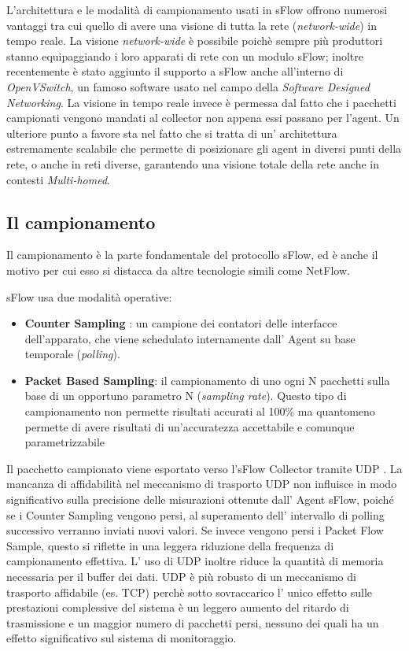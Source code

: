 \documentclass[12pt,a4paper,openright,twoside]{report}
\begin{document}
L'architettura e le modalit\`a di campionamento usati in sFlow offrono numerosi vantaggi
tra cui quello di avere una visione di tutta la rete ({\it network-wide}) in tempo
reale. La visione {\it network-wide} \`e possibile poich\`e sempre pi\`u produttori
stanno equipaggiando i loro apparati di rete con un modulo sFlow; inoltre recentemente
\`e stato aggiunto il supporto a sFlow anche all'interno di {\it OpenVSwitch}, un
famoso software usato nel campo della {\it Software Designed Networking}.
 La visione in tempo reale invece \`e permessa dal fatto che i pacchetti campionati
 vengono mandati al collector non appena essi passano per
l'agent.
Un ulteriore punto a favore sta nel fatto che si tratta di un' architettura
estremamente scalabile che permette di posizionare gli agent in diversi punti della rete,
o anche in reti diverse, garantendo una visione totale della rete anche in contesti
{\it Multi-homed}.

\subsection{Il campionamento}

Il campionamento \`e la parte fondamentale del protocollo sFlow, ed \`e anche
il motivo per cui esso si distacca da altre tecnologie simili come NetFlow.

sFlow usa due modalit\`a operative:
\begin{itemize}
  \item {\bf Counter Sampling} : un campione dei contatori delle interfacce dell'apparato, che viene
  schedulato internamente dall' Agent su base temporale ({\it polling}).
  \item {\bf Packet Based Sampling}: il campionamento di uno ogni N pacchetti
  sulla base di un opportuno parametro N ({\it sampling rate}). Questo tipo di campionamento non
  permette risultati accurati al 100\% ma quantomeno permette di avere risultati
  di un'accuratezza accettabile e comunque parametrizzabile
\end{itemize}

Il pacchetto campionato viene esportato verso l'sFlow Collector tramite UDP \cite{B1}.
La mancanza di affidabilit\`a nel meccanismo di trasporto UDP non influisce in modo
significativo sulla precisione delle misurazioni ottenute dall' Agent sFlow, poich\'e se
i Counter Sampling vengono persi, al superamento dell' intervallo di polling
successivo verranno inviati nuovi valori. Se invece vengono persi i Packet Flow Sample, questo si riflette in
una leggera riduzione della frequenza di campionamento effettiva.  L' uso di UDP
inoltre riduce la quantit\`a di memoria necessaria per il buffer dei dati. UDP \`e pi\`u
robusto di un meccanismo di trasporto  affidabile (es. TCP) perch\`e sotto sovraccarico
l' unico effetto sulle prestazioni complessive del sistema \`e un leggero aumento
del ritardo di trasmissione e un maggior numero di pacchetti persi, nessuno dei
quali ha un effetto significativo sul sistema di monitoraggio.
\end{document}
